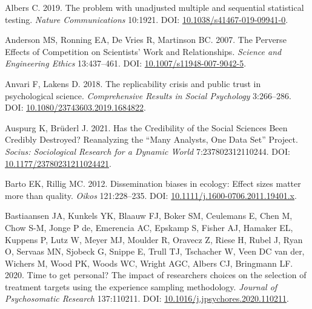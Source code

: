 \documentclass[10pt,a4paper]{article}
\newlength{\cslhangindent}
\newlength{\cslentryspacingunit} %
\newenvironment{CSLReferences}[2] %
 {%
  \setlength{\parindent}{0pt}
  \ifodd #1
  \let\oldpar\par
  \def\par{\hangindent=\cslhangindent\oldpar}
  \fi
  \setlength{\parskip}{#2\cslentryspacingunit}
 }%
 {}
\begin{document}
\hypertarget{refs}{}
\begin{CSLReferences}{1}{0}
\leavevmode{}%
Albers C. 2019. The problem with unadjusted multiple and sequential statistical testing. \emph{Nature Communications} 10:1921. DOI: \href{https://doi.org/10.1038/s41467-019-09941-0}{10.1038/s41467-019-09941-0}.

\leavevmode{}%
Anderson MS, Ronning EA, De Vries R, Martinson BC. 2007. The {Perverse} {Effects} of {Competition} on {Scientists}' {Work} and {Relationships}. \emph{Science and Engineering Ethics} 13:437--461. DOI: \href{https://doi.org/10.1007/s11948-007-9042-5}{10.1007/s11948-007-9042-5}.

\leavevmode{}%
Anvari F, Lakens D. 2018. The replicability crisis and public trust in psychological science. \emph{Comprehensive Results in Social Psychology} 3:266--286. DOI: \href{https://doi.org/10.1080/23743603.2019.1684822}{10.1080/23743603.2019.1684822}.

\leavevmode{}%
Auspurg K, Brüderl J. 2021. Has the {Credibility} of the {Social} {Sciences} {Been} {Credibly} {Destroyed}? {Reanalyzing} the {``{Many} {Analysts}, {One} {Data} {Set}''} {Project}. \emph{Socius: Sociological Research for a Dynamic World} 7:237802312110244. DOI: \href{https://doi.org/10.1177/23780231211024421}{10.1177/23780231211024421}.

\leavevmode{}%
Barto EK, Rillig MC. 2012. Dissemination biases in ecology: Effect sizes matter more than quality. \emph{Oikos} 121:228--235. DOI: \href{https://doi.org/10.1111/j.1600-0706.2011.19401.x}{10.1111/j.1600-0706.2011.19401.x}.

\leavevmode{}%
Bastiaansen JA, Kunkels YK, Blaauw FJ, Boker SM, Ceulemans E, Chen M, Chow S-M, Jonge P de, Emerencia AC, Epskamp S, Fisher AJ, Hamaker EL, Kuppens P, Lutz W, Meyer MJ, Moulder R, Oravecz Z, Riese H, Rubel J, Ryan O, Servaas MN, Sjobeck G, Snippe E, Trull TJ, Tschacher W, Veen DC van der, Wichers M, Wood PK, Woods WC, Wright AGC, Albers CJ, Bringmann LF. 2020. Time to get personal? {The} impact of researchers choices on the selection of treatment targets using the experience sampling methodology. \emph{Journal of Psychosomatic Research} 137:110211. DOI: \href{https://doi.org/10.1016/j.jpsychores.2020.110211}{10.1016/j.jpsychores.2020.110211}.


\end{CSLReferences}
\end{document}

